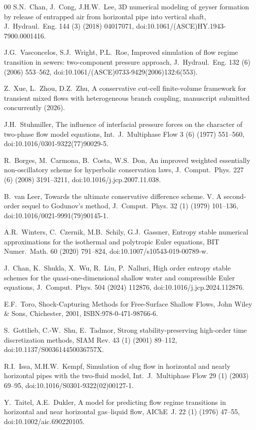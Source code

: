 \documentclass[preprint,12pt]{elsarticle}
\begin{document}
\begin{thebibliography}{00}
S.N.~Chan, J.~Cong, J.H.W.~Lee,
3D numerical modeling of geyser formation by release of entrapped air from
horizontal pipe into vertical shaft,
J.~Hydraul.~Eng. 144 (3) (2018) 04017071,
doi:10.1061/(ASCE)HY.1943-7900.0001416.

J.G.~Vasconcelos, S.J.~Wright, P.L.~Roe,
Improved simulation of flow regime transition in sewers: two-component
pressure approach,
J.~Hydraul.~Eng. 132 (6) (2006) 553--562,
doi:10.1061/(ASCE)0733-9429(2006)132:6(553).

Z.~Xue, L.~Zhou, D.Z.~Zhu,
A conservative cut-cell finite-volume framework for transient mixed flows with
heterogeneous branch coupling,
manuscript submitted concurrently (2026).

J.H.~Stuhmiller,
The influence of interfacial pressure forces on the character of two-phase
flow model equations,
Int.~J.~Multiphase Flow 3 (6) (1977) 551--560,
doi:10.1016/0301-9322(77)90029-5.

{\raggedright
R.~Borges, M.~Carmona, B.~Costa, W.S.~Don,
An improved weighted essentially non-oscillatory scheme for hyperbolic
conservation laws,
J.~Comput.~Phys. 227 (6) (2008) 3191--3211,
doi:10.1016/j.jcp.2007.11.038.\par}

B.~van Leer,
Towards the ultimate conservative difference scheme. V. A second-order
sequel to Godunov's method,
J.~Comput.~Phys. 32 (1) (1979) 101--136,
doi:10.1016/0021-9991(79)90145-1.

A.R.~Winters, C.~Czernik, M.B.~Schily, G.J.~Gassner,
Entropy stable numerical approximations for the isothermal and polytropic
Euler equations,
BIT Numer.~Math. 60 (2020) 791--824,
doi:10.1007/s10543-019-00789-w.

J.~Chan, K.~Shukla, X.~Wu, R.~Liu, P.~Nalluri,
High order entropy stable schemes for the quasi-one-dimensional shallow water
and compressible Euler equations,
J.~Comput.~Phys. 504 (2024) 112876,
doi:10.1016/j.jcp.2024.112876.

E.F.~Toro,
Shock-Capturing Methods for Free-Surface Shallow Flows,
John Wiley \& Sons, Chichester, 2001,
ISBN:978-0-471-98766-6.

S.~Gottlieb, C.-W.~Shu, E.~Tadmor,
Strong stability-preserving high-order time discretization methods,
SIAM Rev. 43 (1) (2001) 89--112,
doi:10.1137/S003614450036757X.

R.I.~Issa, M.H.W.~Kempf,
Simulation of slug flow in horizontal and nearly horizontal pipes with the
two-fluid model,
Int.~J.~Multiphase Flow 29 (1) (2003) 69--95,
doi:10.1016/S0301-9322(02)00127-1.

Y.~Taitel, A.E.~Dukler,
A model for predicting flow regime transitions in horizontal and near
horizontal gas--liquid flow,
AIChE~J. 22 (1) (1976) 47--55,
doi:10.1002/aic.690220105.

\end{thebibliography}
\end{document}
